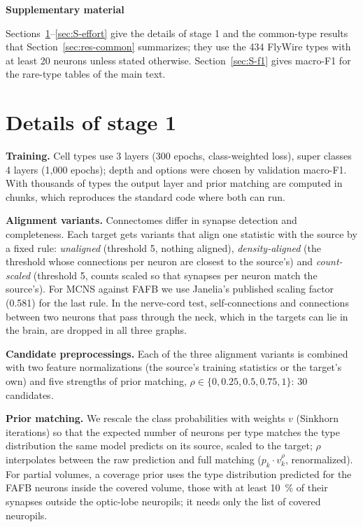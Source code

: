 \documentclass[11pt,a4paper]{article}
\begin{document}



\clearpage
\setcounter{section}{0}
\setcounter{table}{0}
\setcounter{figure}{0}
\renewcommand{\thesection}{S\arabic{section}}
\renewcommand{\thetable}{S\arabic{table}}
\renewcommand{\thefigure}{S\arabic{figure}}
\begin{center}\Large\bfseries Supplementary material\end{center}
\suppressfloats[t]

Sections~\ref{sec:S-details}–\ref{sec:S-effort} give the details of stage 1 and the common-type results that Section~\ref{sec:res-common} summarizes; they use the 434 FlyWire types with at least 20 neurons unless stated otherwise. Section~\ref{sec:S-f1} gives macro-F1 for the rare-type tables of the main text.

\section{Details of stage 1}\label{sec:S-details}

\textbf{Training.} Cell types use 3 layers (300 epochs, class-weighted loss), super classes 4 layers (1,000 epochs); depth and options were chosen by validation macro-F1. With thousands of types the output layer and prior matching are computed in chunks, which reproduces the standard code where both can run.

\textbf{Alignment variants.} Connectomes differ in synapse detection and completeness. Each target gets variants that align one statistic with the source by a fixed rule: \emph{unaligned} (threshold 5, nothing aligned), \emph{density-aligned} (the threshold whose connections per neuron are closest to the source's) and \emph{count-scaled} (threshold 5, counts scaled so that synapses per neuron match the source's). For MCNS against FAFB we use Janelia's published scaling factor (0.581) for the last rule. In the nerve-cord test, self-connections and connections between two neurons that pass through the neck, which in the targets can lie in the brain, are dropped in all three graphs.

\textbf{Candidate preprocessings.} Each of the three alignment variants is combined with two feature normalizations (the source's training statistics or the target's own) and five strengths of prior matching, $\rho \in \{0, 0.25, 0.5, 0.75, 1\}$: 30 candidates.

\textbf{Prior matching.} We rescale the class probabilities with weights $v$ (Sinkhorn iterations) so that the expected number of neurons per type matches the type distribution the same model predicts on its source, scaled to the target; $\rho$ interpolates between the raw prediction and full matching ($p_k \cdot v_k^{\rho}$, renormalized). For partial volumes, a coverage prior uses the type distribution predicted for the FAFB neurons inside the covered volume, those with at least 10~\% of their synapses outside the optic-lobe neuropils; it needs only the list of covered neuropils.
\end{document}
